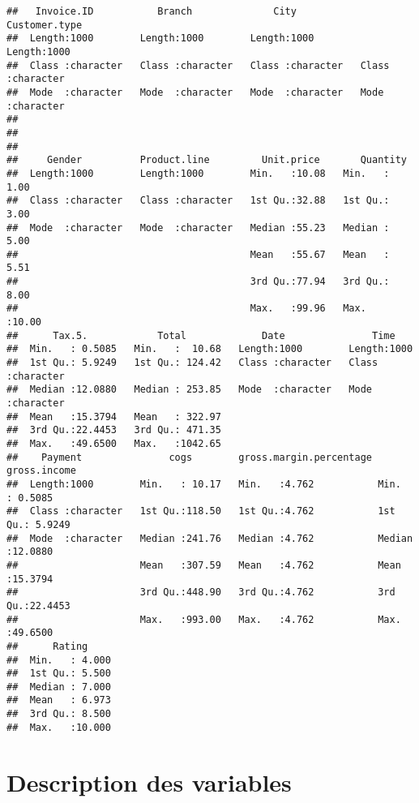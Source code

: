 \documentclass[
]{article}
\begin{document}
\begin{verbatim}
##   Invoice.ID           Branch              City           Customer.type     
##  Length:1000        Length:1000        Length:1000        Length:1000       
##  Class :character   Class :character   Class :character   Class :character  
##  Mode  :character   Mode  :character   Mode  :character   Mode  :character  
##                                                                             
##                                                                             
##                                                                             
##     Gender          Product.line         Unit.price       Quantity    
##  Length:1000        Length:1000        Min.   :10.08   Min.   : 1.00  
##  Class :character   Class :character   1st Qu.:32.88   1st Qu.: 3.00  
##  Mode  :character   Mode  :character   Median :55.23   Median : 5.00  
##                                        Mean   :55.67   Mean   : 5.51  
##                                        3rd Qu.:77.94   3rd Qu.: 8.00  
##                                        Max.   :99.96   Max.   :10.00  
##      Tax.5.            Total             Date               Time          
##  Min.   : 0.5085   Min.   :  10.68   Length:1000        Length:1000       
##  1st Qu.: 5.9249   1st Qu.: 124.42   Class :character   Class :character  
##  Median :12.0880   Median : 253.85   Mode  :character   Mode  :character  
##  Mean   :15.3794   Mean   : 322.97                                        
##  3rd Qu.:22.4453   3rd Qu.: 471.35                                        
##  Max.   :49.6500   Max.   :1042.65                                        
##    Payment               cogs        gross.margin.percentage  gross.income    
##  Length:1000        Min.   : 10.17   Min.   :4.762           Min.   : 0.5085  
##  Class :character   1st Qu.:118.50   1st Qu.:4.762           1st Qu.: 5.9249  
##  Mode  :character   Median :241.76   Median :4.762           Median :12.0880  
##                     Mean   :307.59   Mean   :4.762           Mean   :15.3794  
##                     3rd Qu.:448.90   3rd Qu.:4.762           3rd Qu.:22.4453  
##                     Max.   :993.00   Max.   :4.762           Max.   :49.6500  
##      Rating      
##  Min.   : 4.000  
##  1st Qu.: 5.500  
##  Median : 7.000  
##  Mean   : 6.973  
##  3rd Qu.: 8.500  
##  Max.   :10.000
\end{verbatim}

\hypertarget{description-des-variables}{%
\section{Description des variables}\label{description-des-variables}}
\end{document}
